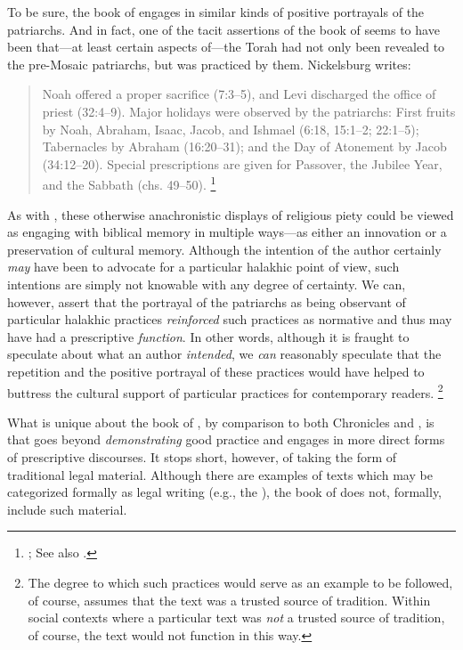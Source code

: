 To be sure, the book of \jub engages in similar kinds of positive portrayals of the patriarchs. And in fact, one of the tacit assertions of the book of \jub seems to have been that---at least certain aspects of---the Torah had not only been revealed to the pre-Mosaic patriarchs, but was practiced by them. Nickelsburg writes:
    \begin{quote}
        Noah offered a proper sacrifice (7:3--5), and Levi discharged the office of priest (32:4--9). Major holidays were observed by the patriarchs: First fruits by Noah, Abraham, Isaac, Jacob, and Ishmael (6:18, 15:1--2; 22:1--5); Tabernacles by Abraham (16:20--31); and the Day of Atonement by Jacob (34:12--20). Special prescriptions are given for Passover, the Jubilee Year, and the Sabbath (chs. 49--50).%
        \footnote{\Cite[69]{nickelsburg2005};
            See also \cite[70]{crawford2008}.}
    \end{quote}
\noindent
As with \ga, these otherwise anachronistic displays of religious piety could be viewed as engaging with biblical memory in multiple ways---as either an innovation or a preservation of cultural memory. Although the intention of the author certainly \emph{may} have been to advocate for a particular halakhic point of view, such intentions are simply not knowable with any degree of certainty. We can, however, assert that the portrayal of the patriarchs as being observant of particular halakhic practices \emph{reinforced} such practices as normative and thus may have had a prescriptive \emph{function}. In other words, although it is fraught to speculate about what an author \emph{intended}, we \emph{can} reasonably speculate that the repetition and the positive portrayal of these practices would have helped to buttress the cultural support of particular practices for contemporary readers.
    \footnote{The degree to which such practices would serve as an example to be followed, of course, assumes that the text was a trusted source of tradition. Within social contexts where a particular text was \emph{not} a trusted source of tradition, of course, the text would not function in this way.}

What is unique about the book of \jub, by comparison to both Chronicles and \ga, is that \jub goes beyond \emph{demonstrating} good practice and engages in more direct forms of prescriptive discourses. It stops short, however, of taking the form of traditional legal material. Although there are examples of \rwb texts which may be categorized formally as legal writing (e.g., the \templescroll\autocite{fraade_goldstein-etal2017}), the book of \jub does not, formally, include such material. 

